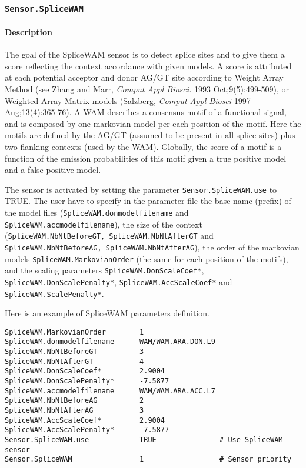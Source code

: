 
\subsubsection{\texttt{Sensor.SpliceWAM}}

\paragraph{Description}

The goal of the SpliceWAM sensor is to detect splice sites and to
give them a score reflecting the context accordance with given
models. A score is attributed at each potential acceptor and donor
AG/GT site according to Weight Array Method (see Zhang and Marr, {\em
Comput Appl Biosci.} 1993 Oct;9(5):499-509), or Weighted Array Matrix
models (Salzberg, {\em Comput Appl Biosci} 1997 Aug;13(4):365-76). A
WAM describes a consensus motif of a functional signal, and is
composed by one markovian model per each position of the motif. Here
the motifs are defined by the AG/GT (assumed to be present in all
splice sites) plus two flanking contexts (used by the WAM).  Globally,
the score of a motif is a function of the emission probabilities of
this motif given a true positive model and a false positive model.

The sensor is activated by setting the parameter
\texttt{Sensor.SpliceWAM.use} to TRUE.  The user have to specify in
the parameter file the base name (prefix) of the model files
(\texttt{SpliceWAM.donmodelfilename} and
\texttt{SpliceWAM.accmodelfilename}), the size of the context
(\texttt{SpliceWAM.NbNtBeforeGT, SpliceWAM.NbNtAfterGT} and
\texttt{SpliceWAM.NbNtBeforeAG, SpliceWAM.NbNtAfterAG}), the order of
the markovian models \texttt{SpliceWAM.MarkovianOrder} (the same for
each position of the motifs), and the scaling parameters
\texttt{SpliceWAM.DonScaleCoef*}, \texttt{SpliceWAM.DonScalePenalty*},
\texttt{SpliceWAM.AccScaleCoef*} and \texttt{SpliceWAM.ScalePenalty*}.

Here is an example of SpliceWAM parameters definition.
\begin{Verbatim}[fontsize=\small]
SpliceWAM.MarkovianOrder        1
SpliceWAM.donmodelfilename      WAM/WAM.ARA.DON.L9
SpliceWAM.NbNtBeforeGT          3
SpliceWAM.NbNtAfterGT           4
SpliceWAM.DonScaleCoef*         2.9004
SpliceWAM.DonScalePenalty*      -7.5877
SpliceWAM.accmodelfilename      WAM/WAM.ARA.ACC.L7
SpliceWAM.NbNtBeforeAG          2
SpliceWAM.NbNtAfterAG           3
SpliceWAM.AccScaleCoef*         2.9004
SpliceWAM.AccScalePenalty*      -7.5877
Sensor.SpliceWAM.use            TRUE               # Use SpliceWAM sensor
Sensor.SpliceWAM                1                  # Sensor priority
\end{Verbatim}


